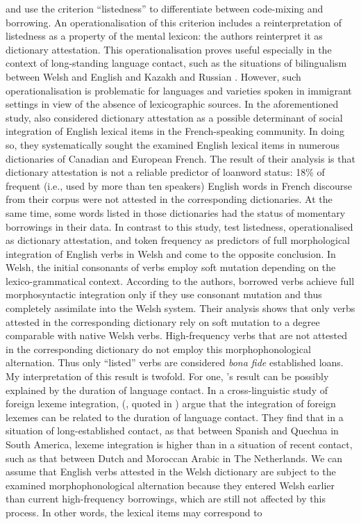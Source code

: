 \citet{muhamedowa-untersuchung-2006} and \citet{stammers-deuchar-2012} use the criterion ``listedness'' to differentiate between code-mixing and borrowing. An operationalisation of this criterion includes a reinterpretation of listedness as a property of the mental lexicon: the authors reinterpret it as dictionary attestation. This operationalisation proves useful especially in the context of long-standing language contact, such as the situations of bilingualism between Welsh and English \citep{stammers-deuchar-2012} and Kazakh and Russian \citep{muhamedowa-untersuchung-2006}. However, such operationalisation is problematic for languages and varieties spoken in immigrant settings in view of the absence of lexicographic sources. In the aforementioned study, \citet{poplack-etal-1988} also considered dictionary attestation as a possible determinant of social integration of English lexical items in the French-speaking community. In doing so, they systematically sought the examined English lexical items in numerous dictionaries of Canadian and European French. The result of their analysis \citep[58--59]{poplack-etal-1988} is that dictionary attestation is not a reliable predictor of loanword status: 18\% of frequent (i.e., used by more than ten speakers) English words in French discourse from their corpus were not attested in the corresponding dictionaries. At the same time, some words listed in those dictionaries had the status of momentary borrowings in their data. In contrast to this study, \citet{stammers-deuchar-2012} test listedness, operationalised as dictionary attestation, and token frequency as predictors of full morphological integration of English verbs in Welsh and come to the opposite conclusion. In Welsh, the initial consonants of verbs employ soft mutation depending on the lexico-grammatical context. According to the authors, borrowed verbs achieve full morphosyntactic integration only if they use consonant mutation and thus completely assimilate into the Welsh system. Their analysis shows that only verbs attested in the corresponding dictionary rely on soft mutation to a degree comparable with native Welsh verbs. High-frequency verbs that are not attested in the corresponding dictionary do not employ this morphophonological alternation. Thus only ``listed'' verbs are considered \textit{bona fide} established loans. My interpretation of this result is twofold. For one, \citeauthor{stammers-deuchar-2012}'s result can be possibly explained by the duration of language contact. In a cross-linguistic study of foreign lexeme integration, \citeauthor{nortier-schatz} (\citeyear{nortier-schatz}, quoted in \citealt[][53]{boumans-syntax-1998}) argue that the integration of foreign lexemes can be related to the duration of language contact. They find that in a situation of long-established contact, as that between Spanish and Quechua in South America, lexeme integration is higher than in a situation of recent contact, such as that between Dutch and Moroccan Arabic in The Netherlands. We can assume that English verbs attested in the Welsh dictionary are subject to the examined morphophonological alternation because they entered Welsh earlier than current high-frequency borrowings, which are still not affected by this process. In other words, the lexical items may correspond to 